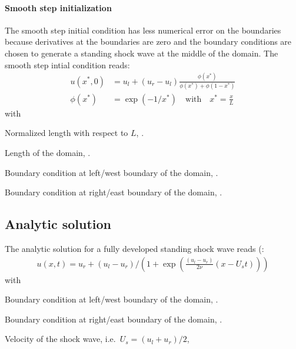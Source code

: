 \paragraph*{Smooth step initialization}
The smooth step initial condition has less numerical error on the boundaries because derivatives at the boundaries are zero and the boundary conditions are chosen to generate a standing shock wave at the middle of the domain.
The smooth step intial condition reads:
\begin{align}
    u(x^*,0) &= u_l +
    (u_r - u_l) \frac{\phi(x^*) }{ \phi(x^*) + \phi(1-x^*)}
    \label{eq:smoothstep}
    \\
    \phi(x^*) &= \exp(-1 / x^* ) \quad \text{with} \quad x^* = \frac{x}{L}
\end{align}
with
\begin{symbollist}
    \item[$x^*$] Normalized length with respect to $L$, \bunit{-}.
    \item[$L_x$] Length of the domain, \bunit{\metre}.
    \item[$u_l$] Boundary condition at left/west boundary of the domain, \bunit{\metre\per\second}.
    \item[$u_r$] Boundary condition at right/east boundary of the domain, \bunit{\metre\per\second}.
\end{symbollist}

\subsection{Analytic solution}
The analytic solution for a fully developed standing shock wave reads (\citet[eq.\ 4.23]{Whitham1999}:
\begin{align}
    u(x,t) = u_r + (u_l - u_r)/
    \left(1 + \exp\left(\frac{(u_l - u_r)}{2\nu}(x-U_{s}t)\right)\right)
    \label{eq:burgers_analytic_solution}
\end{align}
with
\begin{symbollist}
    \item[$u_l$] Boundary condition at left/west boundary of the domain, \bunit{\metre\per\second}.
    \item[$u_r$] Boundary condition at right/east boundary of the domain, \bunit{\metre\per\second}.
    \item[$U_{s}$] Velocity of the shock wave, i.e.\ $U_{s} = (u_l + u_r)/2$, \bunit{\metre\per\second}
\end{symbollist}
